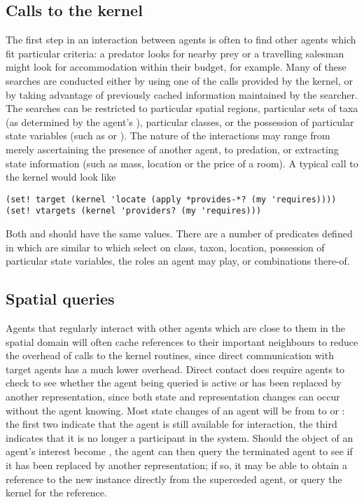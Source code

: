 \subsection{Calls to the kernel}\label{interactions}
The first step in an interaction between agents is often to find other
agents which fit particular criteria: a predator looks for nearby prey
or a travelling salesman might look for accommodation within their
budget, for example.  Many of these searches are conducted either by
using one of the  calls provided by the kernel, or by
taking advantage of previously cached information maintained by the
searcher. The searches can be restricted to particular spatial
regions, particular sets of taxa (as determined by the agent's
), particular classes, or the possession of particular
state variables (such as  or
). The nature of the interactions may range from
merely ascertaining the presence of another agent, to predation, or
extracting state information (such as mass, location or the price of a
room).  A typical call to the kernel would look like
\begin{verbatim}
(set! target (kernel 'locate (apply *provides-*? (my 'requires))))
(set! vtargets (kernel 'providers? (my 'requires)))
\end{verbatim}
Both  and  should have the same
values.  There are a number of predicates defined
in  which are similar to 
which select on class, taxon, location, possession of particular state
variables, the roles an agent may play, or combinations there-of.

\subsection{Spatial queries}
Agents that regularly interact with other agents which are close to
them in the spatial domain will often cache references to their
important neighbours to reduce the overhead of calls to the kernel
routines, since direct communication with target agents has a much
lower overhead. Direct contact does require agents to check to see
whether the agent being queried is active or has been replaced by
another representation, since both state and representation changes
can occur without the agent knowing. Most state changes of an agent
will be from  to 
or : the first two indicate that the agent is
still available for interaction, the third indicates that it is no
longer a participant in the system. Should the object of an agent's
interest become , the agent can then query the
terminated agent to see if it has been replaced by another
representation; if so, it may be able to obtain a reference to the new
instance directly from the superceded agent, or query the kernel for
the reference.

